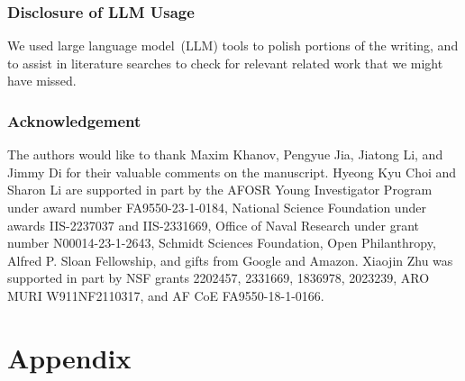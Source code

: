 \documentclass{article}
\begin{document}
\section*{Disclosure of LLM Usage} 
We used large language model~(LLM) tools to polish portions of the writing, and to assist in literature searches to check for relevant related work that we might have missed.



\section*{Acknowledgement}

The authors would like to thank Maxim Khanov, Pengyue Jia, Jiatong Li, and Jimmy Di for their valuable comments on the manuscript. Hyeong Kyu Choi and Sharon Li are supported in part by the AFOSR Young Investigator Program under award number FA9550-23-1-0184, National Science Foundation under awards IIS-2237037 and IIS-2331669, Office of Naval Research under grant number N00014-23-1-2643, Schmidt Sciences Foundation, Open Philanthropy, Alfred P. Sloan Fellowship, and gifts from Google and Amazon. Xiaojin Zhu was supported in part by NSF grants 2202457, 2331669, 1836978, 2023239, ARO MURI W911NF2110317, and AF CoE FA9550-18-1-0166.


\onecolumn\appendix

\part{Appendix} %
\parttoc %


\newpage








\end{document}
